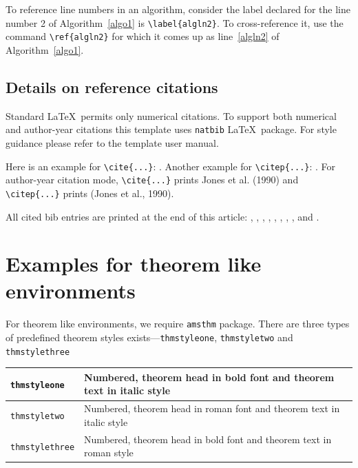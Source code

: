\documentclass[sn-standardnature]{sn-jnl}%
\theoremstyle{thmstyleone}%
\theoremstyle{thmstyletwo}%
\theoremstyle{thmstylethree}%
\begin{document}
To reference line numbers in an algorithm, consider the label declared for the line number 2 of Algorithm~\ref{algo1} is \verb+\label{algln2}+. To cross-reference it, use the command \verb+\ref{algln2}+ for which it comes up as line~\ref{algln2} of Algorithm~\ref{algo1}.

\subsection{Details on reference citations}\label{subsec7}

Standard \LaTeX\ permits only numerical citations. To support both numerical and author-year citations this template uses \verb+natbib+ \LaTeX\ package. For style guidance please refer to the template user manual.

Here is an example for \verb+\cite{...}+: \cite{bib1}. Another example for \verb+\citep{...}+: \citep{bib2}. For author-year citation mode, \verb+\cite{...}+ prints Jones et al. (1990) and \verb+\citep{...}+ prints (Jones et al., 1990).

All cited bib entries are printed at the end of this article: \cite{bib3}, \cite{bib4}, \cite{bib5}, \cite{bib6}, \cite{bib7}, \cite{bib8}, \cite{bib9}, \cite{bib10}, \cite{bib11} and \cite{bib12}.

\section{Examples for theorem like environments}\label{sec10}

For theorem like environments, we require \verb+amsthm+ package. There are three types of predefined theorem styles exists---\verb+thmstyleone+, \verb+thmstyletwo+ and \verb+thmstylethree+ 

\bigskip
\begin{tabular}{|l|p{19pc}|}
\hline
\verb+thmstyleone+ & Numbered, theorem head in bold font and theorem text in italic style \\\hline
\verb+thmstyletwo+ & Numbered, theorem head in roman font and theorem text in italic style \\\hline
\verb+thmstylethree+ & Numbered, theorem head in bold font and theorem text in roman style \\\hline
\end{tabular}
\bigskip
\end{document}
